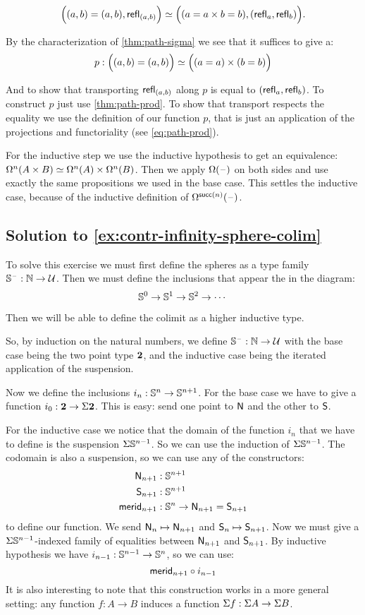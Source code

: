 \documentclass[
%
%
11pt %
]{article}
\begin{document}
\[ \Bigl((a,b)=(a,b), \mathsf{refl}_{(a,b)}\Bigr)  \simeq \Bigl((a=a \times b=b), (\mathsf{refl}_{a}, \mathsf{refl}_{b})\Bigr).\]

By the characterization of \cref{thm:path-sigma} we see
that it suffices to give a:
\[p:\Bigl((a,b)=(a,b)\Bigr) \simeq \Bigl((a=a)\times (b=b)\Bigr)\]

And to show that transporting $\mathsf{refl}_{(a,b)}$ along $p$ is equal to
$(\mathsf{refl}_{a}, \mathsf{refl}_{b})$.  To construct $p$ just use \cref{thm:path-prod}. To
show that transport respects the equality we use
the definition
of our function $p$, that is just an application of the projections and
functoriality (see \cref{eq:path-prod}).

For the inductive step we use the inductive hypothesis to get an equivalence:
$\Omega^n(A \times B) \simeq \Omega^n(A) \times \Omega^n(B)$.
Then we apply $\Omega(\mathord{\hspace{1pt}\text{--}\hspace{1pt}})$ on both sides and use exactly the same
propositions we used in the base
case. This settles the inductive case, because of the inductive definition of
$\Omega^{\mathsf{succ}(n)}(\mathord{\hspace{1pt}\text{--}\hspace{1pt}})$.


\subsection*{Solution to \cref{ex:contr-infinity-sphere-colim}}

To solve this exercise we must first define the spheres as a type family
$\mathbb{S}^{\mathord{\hspace{1pt}\text{--}\hspace{1pt}}} : \mathbb{N} \to \mathcal{U}$.
Then we must define the inclusions that appear the in the diagram:
\[ \mathbb{S}^0 \to \mathbb{S}^1 \to \mathbb{S}^2 \to\cdots \]

Then we will be able to define the colimit as
a higher inductive type.

So, by induction on the natural numbers, we define $\mathbb{S}^{\mathord{\hspace{1pt}\text{--}\hspace{1pt}}} : \mathbb{N} \to \mathcal{U}$
with the base case being the two point type $\mathbf{2}$, and the inductive case
being the iterated application of the suspension.

Now we define the inclusions $i_n : \mathbb{S}^n \to \mathbb{S}^{n+1}$.
For the base case we have to give a function $i_0 : \mathbf{2} \to \Sigma \mathbf{2}$.
This is easy: send one point to $\mathsf{N}$ and the other to $\mathsf{S}$.

For the inductive case we notice that the domain of the function $i_n$ that
we have to define is the suspension $\Sigma \mathbb{S}^{n-1}$. So we can use the
induction of $\Sigma \mathbb{S}^{n-1}$. The codomain is also a suspension, so we can
use any of the constructors:
\begin{align*}
  \mathsf{N}_{n+1} &: \mathbb{S}^{n+1}\\
  \mathsf{S}_{n+1} &: \mathbb{S}^{n+1}\\
  \mathsf{merid}_{n+1} &:\mathbb{S}^n \to \mathsf{N}_{n+1} = \mathsf{S}_{n+1}
\end{align*}
to define our function.
We send $\mathsf{N}_n \mapsto \mathsf{N}_{n+1}$ and $\mathsf{S}_n \mapsto \mathsf{S}_{n+1}$.
Now we must give a $\Sigma \mathbb{S}^{n-1}$-indexed family of equalities between
$\mathsf{N}_{n+1}$ and $\mathsf{S}_{n+1}$. By inductive hypothesis we have
$i_{n-1} : \mathbb{S}^{n-1} \to \mathbb{S}^n$, so we can use:
\[ \mathsf{merid}_{n+1} \circ i_{n-1} \]
It is also interesting to note that this construction works in a more general
setting: any function $f : A \to B$ induces a function $\Sigma f : \Sigma A \to \Sigma B$.
\end{document}
